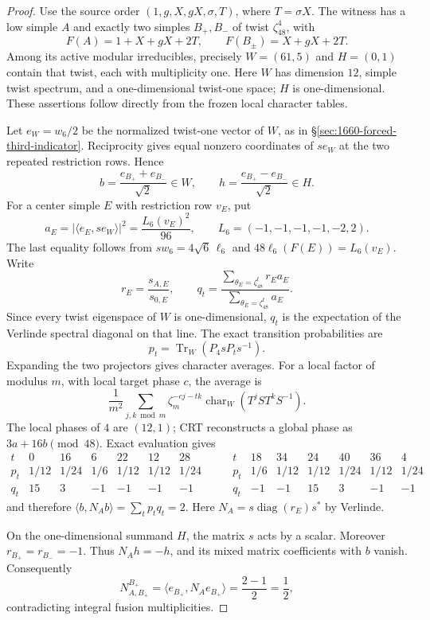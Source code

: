 \begin{proof}
Use the source order $(1,g,X,gX,\sigma,T)$, where $T=\sigma X$.
The witness has a low simple $A$ and exactly two simples $B_+,B_-$ of
twist $\zeta_{48}^{4}$, with
\[
 F(A)=1+X+gX+2T,\qquad F(B_\pm)=X+gX+2T.
\]
Among its active modular irreducibles, precisely $W=(61,5)$ and
$H=(0,1)$ contain that twist, each with multiplicity one. Here $W$ has
dimension $12$, simple twist spectrum, and a one-dimensional twist-one
space; $H$ is one-dimensional. These assertions follow directly from
the frozen local character tables.

Let $e_W=w_6/2$ be the normalized twist-one vector of $W$, as in
\S\ref{sec:1660-forced-third-indicator}. Reciprocity gives equal nonzero
coordinates of $se_W$ at the two repeated restriction rows. Hence
\[
 b=\frac{e_{B_+}+e_{B_-}}{\sqrt2}\in W,\qquad
 h=\frac{e_{B_+}-e_{B_-}}{\sqrt2}\in H.
\]
For a center simple $E$ with restriction row $v_E$, put
\[
 a_E=|\langle e_E,se_W\rangle|^2
     =\frac{L_6(v_E)^2}{96},\qquad
 L_6=(-1,-1,-1,-1,-2,2).
\]
The last equality follows from $sw_6=4\sqrt6\,\ell_6$ and
$48\ell_6(F(E))=L_6(v_E)$. Write
\[
 r_E=\frac{s_{A,E}}{s_{0,E}},\qquad
 q_t=\frac{\sum_{\theta_E=\zeta_{48}^t}r_Ea_E}
              {\sum_{\theta_E=\zeta_{48}^t}a_E}.
\]
Since every twist eigenspace of $W$ is one-dimensional, $q_t$ is the
expectation of the Verlinde spectral diagonal on that line. The exact
transition probabilities are
\[
 p_t=\operatorname{Tr}_W(P_4sP_ts^{-1}).
\]
Expanding the two projectors gives character averages. For a local
factor of modulus $m$, with local target phase $c$, the average is
\[
 \frac1{m^2}\sum_{j,k\bmod m}
 \zeta_m^{-cj-tk}\operatorname{char}_W(T^jST^kS^{-1}).
\]
The local phases of $4$ are $(12,1)$; CRT reconstructs a global phase
as $3a+16b\pmod {48}$. Exact evaluation gives
\[
\begin{array}{c|rrrrrr}
 t&0&16&6&22&12&28\\\hline
 p_t&1/12&1/24&1/6&1/12&1/12&1/24\\
 q_t&15&3&-1&-1&-1&-1
\end{array}
\qquad
\begin{array}{c|rrrrrr}
 t&18&34&24&40&36&4\\\hline
 p_t&1/6&1/12&1/12&1/24&1/12&1/24\\
 q_t&-1&-1&15&3&-1&-1
\end{array}
\]
and therefore $\langle b,N_A b\rangle=\sum_t p_tq_t=2$.
Here $N_A=s\operatorname{diag}(r_E)s^*$ by Verlinde.

On the one-dimensional summand $H$, the matrix $s$ acts by a scalar.
Moreover $r_{B_+}=r_{B_-}=-1$. Thus $N_Ah=-h$, and its mixed matrix
coefficients with $b$ vanish. Consequently
\[
 N_{A,B_+}^{B_+}=\langle e_{B_+},N_Ae_{B_+}\rangle
                =\frac{2-1}{2}=\frac12,
\]
contradicting integral fusion multiplicities.
\end{proof}

